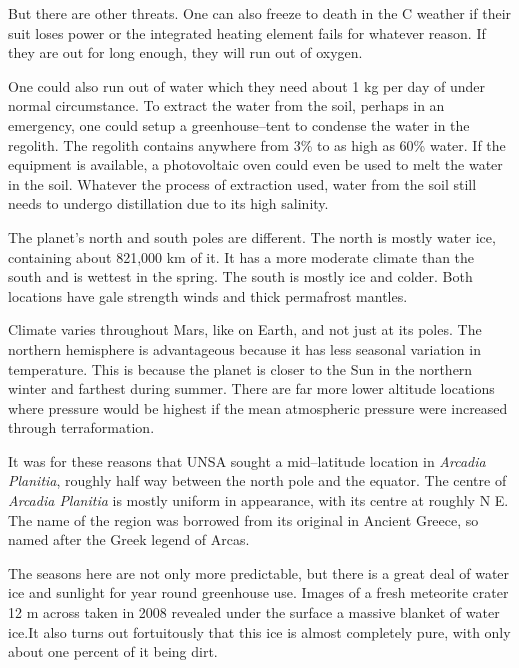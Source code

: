 But there are other threats. One can also freeze to death in the C weather if their suit loses power or the integrated heating element fails for whatever reason. If they are out for long enough, they will run out of oxygen.

One could also run out of water which they need about 1 kg per day of under normal circumstance. To extract the water from the soil, perhaps in an emergency, one could setup a greenhouse--tent to condense the water in the regolith. The regolith contains anywhere from 3\% to as high as 60\% water. If the equipment is available, a photovoltaic oven could even be used to melt the water in the soil. Whatever the process of extraction used, water from the soil still needs to undergo distillation due to its high salinity.


The planet's north and south poles are different. The north is mostly water ice, containing about 821,000 km of it. It has a more moderate climate than the south and is wettest in the spring. The south is mostly  ice and colder. Both locations have gale strength winds and thick permafrost mantles.

Climate varies throughout Mars, like on Earth, and not just at its poles. The northern hemisphere is advantageous because it has less seasonal variation in temperature. This is because the planet is closer to the Sun in the northern winter and farthest during summer. There are far more lower altitude locations where pressure would be highest if the mean atmospheric pressure were increased through terraformation.

It was for these reasons that UNSA sought a mid--latitude location in {\it Arcadia Planitia}, roughly half way between the north pole and the equator. The centre of {\it Arcadia Planitia} is mostly uniform in appearance, with its centre at roughly N E. The name of the region was borrowed from its original in Ancient Greece, so named after the Greek legend of Arcas.

The seasons here are not only more predictable, but there is a great deal of water ice and sunlight for year round greenhouse use. Images of a fresh meteorite crater 12 m across taken in 2008 revealed under the surface a massive blanket of water ice. It also turns out fortuitously that this ice is almost completely pure, with only about one percent of it being dirt.

